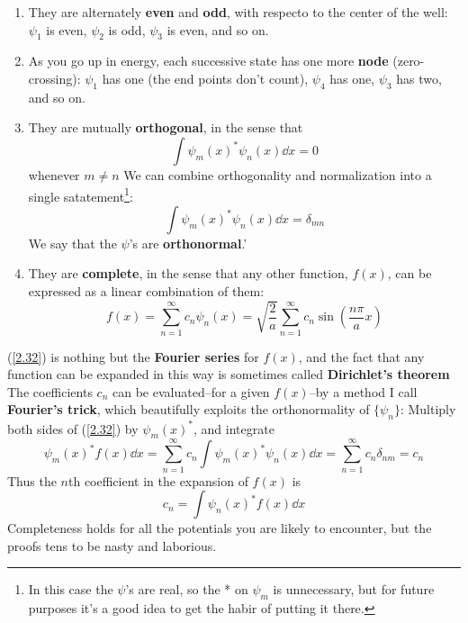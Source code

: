 \begin{enumerate}
	\item They are alternately \textbf{even} and \textbf{odd}, with respecto to the center of the well: $\psi_1$ is even, $\psi_2$ is odd, $\psi_3$ is even,  and so on.
	\item 
		As you go up in energy, each successive state has one more \textbf{node} (zero-crossing): $\psi_1$ has one (the end points don't count), $\psi_4$ has one, $\psi_3$ has two, and so on.
	\item They are mutually \textbf{orthogonal}, in the sense that
		\begin{equation}\label{2.29}
	\int\psi_m(x)^*\psi_n(x)\dd x=0
\end{equation}
whenever $m\neq n$
We can combine orthogonality and normalization into a single satatement\footnote{In this case the $\psi$'s are real, so the * on $\psi_m$ is unnecessary, but for future purposes it's a good idea to get the habir of putting it there.}:
\begin{equation}\label{2.30}
	\boxed{\int\psi_m(x)^*\psi_n(x)\dd x=\delta_{mn}}
\end{equation}
We say that the $\psi$'s are \textbf{orthonormal}.'
\item They are \textbf{complete}, in the sense that any other function, $f(x)$, can be expressed as a linear combination of them:
	\begin{equation}\label{2.32}
	f(x)=\sum_{n=1}^\infty c_n\psi_n(x)=\sqrt{\frac{2}{a}}\sum_{n=1}^\infty c_n\sin\left(\frac{n\pi}{a}x\right)
\end{equation}
\end{enumerate}
(\ref{2.32}) is nothing but the \textbf{Fourier series} for $f(x)$, and the fact that any function can be expanded in this way is sometimes called \textbf{Dirichlet's theorem} 
The coefficients $c_n$ can be evaluated--for a given $f(x)$--by a method I call \textbf{Fourier's trick}, which beautifully exploits the orthonormality of $\{\psi_n\}$: Multiply both sides of (\ref{2.32}) by $\psi_m(x)^*$, and integrate
\begin{equation}\label{2.33}
	\psi_m(x)^*f(x)\dd x=\sum_{n=1}^\infty c_n\int\psi_m(x)^*\psi_n(x)\dd x=\sum_{n=1}^\infty c_n\delta_{nm}=c_n
\end{equation}
Thus the $n$th coefficient in the expansion of $f(x)$ is 
\begin{equation}\label{2.34}
	\boxed{c_n=\int\psi_n(x)^*f(x)\dd x}
\end{equation}
Completeness holds for all the potentials you are likely to encounter, but the proofs tens to be nasty and laborious.

